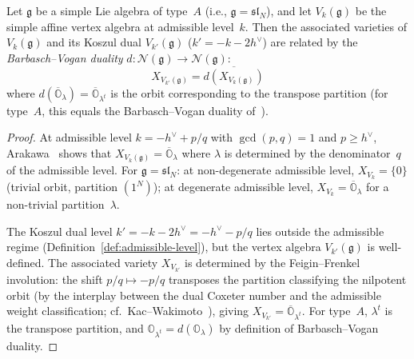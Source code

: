 \begin{proposition}
\label{prop:orbit-duality}
Let $\mathfrak{g}$ be a simple Lie algebra of type~$A$
\textup{(}i.e., $\mathfrak{g} = \mathfrak{sl}_N$\textup{)}, and let
$V_k(\mathfrak{g})$ be the simple affine vertex algebra at admissible
level~$k$.  Then the associated varieties of $V_k(\mathfrak{g})$ and
its Koszul dual $V_{k'}(\mathfrak{g})$ ($k' = -k - 2h^\vee$)
are related by the \emph{Barbasch--Vogan duality} $d\colon
\mathcal{N}(\mathfrak{g}) \to \mathcal{N}(\mathfrak{g})$:
\begin{equation}\label{eq:orbit-duality}
X_{V_{k'}(\mathfrak{g})} = \overline{d(X_{V_k(\mathfrak{g})})}
\end{equation}
where $d(\overline{\mathbb{O}}_\lambda) =
\overline{\mathbb{O}}_{\lambda^t}$ is the orbit corresponding
to the transpose partition \textup{(}for type~$A$, this equals
the Barbasch--Vogan duality of~\cite{BV85}\textup{)}.
\end{proposition}

\begin{proof}
At admissible level $k = -h^\vee + p/q$ with $\gcd(p,q) = 1$ and
$p \geq h^\vee$, Arakawa~\cite{Arakawa17} shows that
$X_{V_k(\mathfrak{g})} = \overline{\mathbb{O}}_\lambda$ where
$\lambda$ is determined by the denominator~$q$ of the admissible
level.  For $\mathfrak{g} = \mathfrak{sl}_N$: at non-degenerate
admissible level, $X_{V_k} = \{0\}$ (trivial orbit, partition
$(1^N)$); at degenerate admissible level,
$X_{V_k} = \overline{\mathbb{O}}_\lambda$ for a non-trivial
partition~$\lambda$.

The Koszul dual level $k' = -k - 2h^\vee = -h^\vee - p/q$
lies outside the admissible regime
(Definition~\ref{def:admissible-level}), but the vertex algebra
$V_{k'}(\mathfrak{g})$ is well-defined.
The associated variety $X_{V_{k'}}$ is determined by the
Feigin--Frenkel involution: the shift $p/q \mapsto -p/q$
transposes the partition classifying the nilpotent orbit
(by the interplay between the dual Coxeter number and the
admissible weight classification;
cf.~Kac--Wakimoto~\cite{KW88}), giving
$X_{V_{k'}} = \overline{\mathbb{O}}_{\lambda^t}$.  For
type~$A$, $\lambda^t$ is the transpose partition, and
$\mathbb{O}_{\lambda^t} = d(\mathbb{O}_\lambda)$ by definition
of Barbasch--Vogan duality.
\end{proof}

